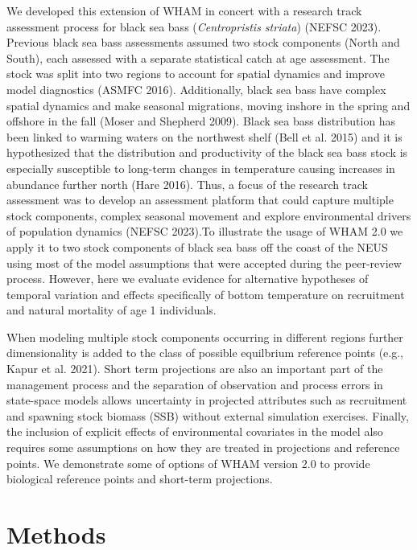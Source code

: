 \documentclass[
]{article}
\begin{document}
We developed this extension of WHAM in concert with a research track
assessment process for black sea bass (\textit{Centropristis striata})
(NEFSC 2023). Previous black sea bass assessments assumed two stock
components (North and South), each assessed with a separate statistical
catch at age assessment. The stock was split into two regions to account
for spatial dynamics and improve model diagnostics (ASMFC 2016).
Additionally, black sea bass have complex spatial dynamics and make
seasonal migrations, moving inshore in the spring and offshore in the
fall (Moser and Shepherd 2009). Black sea bass distribution has been
linked to warming waters on the northwest shelf (Bell et al. 2015) and
it is hypothesized that the distribution and productivity of the black
sea bass stock is especially susceptible to long-term changes in
temperature causing increases in abundance further north (Hare 2016).
Thus, a focus of the research track assessment was to develop an
assessment platform that could capture multiple stock components,
complex seasonal movement and explore environmental drivers of
population dynamics (NEFSC 2023).To illustrate the usage of WHAM 2.0 we
apply it to two stock components of black sea bass off the coast of the
NEUS using most of the model assumptions that were accepted during the
peer-review process. However, here we evaluate evidence for alternative
hypotheses of temporal variation and effects specifically of bottom
temperature on recruitment and natural mortality of age 1 individuals.

When modeling multiple stock components occurring in different regions
further dimensionality is added to the class of possible equilbrium
reference points (e.g., Kapur et al. 2021). Short term projections are
also an important part of the management process and the separation of
observation and process errors in state-space models allows uncertainty
in projected attributes such as recruitment and spawning stock biomass
(SSB) without external simulation exercises. Finally, the inclusion of
explicit effects of environmental covariates in the model also requires
some assumptions on how they are treated in projections and reference
points. We demonstrate some of options of WHAM version 2.0 to provide
biological reference points and short-term projections.

\hypertarget{methods}{%
\section*{Methods}\label{methods}}
\end{document}
